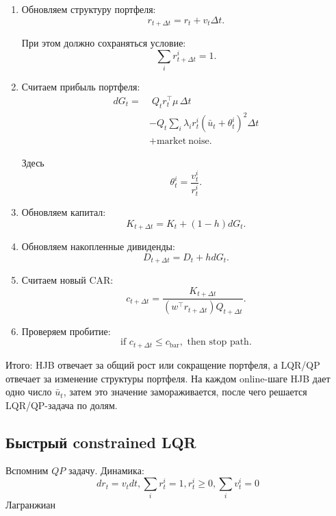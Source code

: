 \documentclass[12pt,a4paper]{article}
\begin{document}
\begin{enumerate}
    Если шум в $Q_t$ не учитывается, используем детерминированное обновление:
    \[
        Q_{t+\Delta t}
        =
        Q_t\exp(\bar u_t\Delta t).
    \]

    \item Обновляем структуру портфеля:
    \[
        r_{t+\Delta t}
        =
        r_t + v_t\Delta t.
    \]

    При этом должно сохраняться условие:
    \[
        \sum_i r_{t+\Delta t}^i = 1.
    \]

    \item Считаем прибыль портфеля:
    \[
    \begin{aligned}
        dG_t
        =
        &\; Q_t r_t^\top \mu \, \Delta t \\
        &- Q_t\sum_i \lambda_i r_t^i
        \left(\bar u_t+\theta_t^i\right)^2\Delta t \\
        &+ \mathrm{market\ noise}.
    \end{aligned}
    \]

    Здесь
    \[
        \theta_t^i = \frac{v_t^i}{r_t^i}.
    \]

    \item Обновляем капитал:
    \[
        K_{t+\Delta t}
        =
        K_t + (1-h)dG_t.
    \]

    \item Обновляем накопленные дивиденды:
    \[
        D_{t+\Delta t}
        =
        D_t + h dG_t.
    \]

    \item Считаем новый CAR:
    \[
        c_{t+\Delta t}
        =
        \frac{K_{t+\Delta t}}
        {(w^\top r_{t+\Delta t})Q_{t+\Delta t}}.
    \]

    \item Проверяем пробитие:
    \[
        \text{if } c_{t+\Delta t} \le c_{\mathrm{bar}},
        \text{ then stop path.}
    \]
\end{enumerate}

Итого: HJB отвечает за общий рост или сокращение портфеля, а LQR/QP отвечает за изменение структуры портфеля. На каждом online-шаге HJB дает одно число $\bar u_t$, затем это значение замораживается, после чего решается LQR/QP-задача по долям.

\subsection{Быстрый constrained LQR}
Вспомним $QP$ задачу. Динамика:
$$
    dr_t = v_t dt, \sum_i r_t^i = 1, r_t^i \ge 0, \sum_i v_t^i = 0
$$
Лагранжиан 
\end{document}
